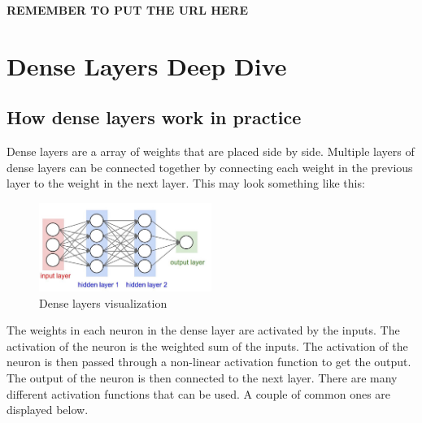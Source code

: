 \documentclass[11pt]{report}
\begin{document}
\textbf{REMEMBER TO PUT THE URL HERE}

\pagebreak

\chapter{Dense Layers Deep Dive}
\section{How dense layers work in practice}
Dense layers are a array of weights that are placed side by side. Multiple layers of dense layers can be connected together by connecting each weight in the previous layer to the weight in the next layer. This may look something like this:

    \begin{figure}[h]
        \begin{center}
        \includegraphics[width=0.5\textwidth]{denselayers.jpeg}
        \caption{Dense layers visualization}
        \label{fig:dense_layers}
        \end{center}
    \end{figure}

The weights in each neuron in the dense layer are activated by the inputs. The activation of the neuron is the weighted sum of the inputs. The activation of the neuron is then passed through a non-linear activation function to get the output. The output of the neuron is then connected to the next layer. There are many different activation functions that can be used. A couple of common ones are displayed below.
 
\end{document}
